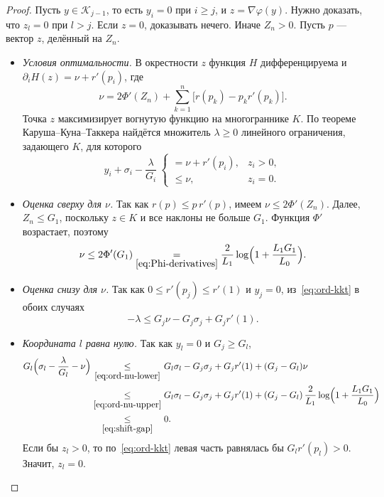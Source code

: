 \documentclass[11pt,a4paper]{article}
\newcommand{\by}[2]{\mathrel{\underset{#2}{#1}}}
\newcommand{\bypad}[3]{\mathrel{\underset{\mathmakebox[\widthof{$\scriptstyle#3$}]{#2}}{#1}}}
\begin{document}
\begin{proof}
Пусть $y\in\mathcal K_{j-1}$, то есть $y_i=0$ при $i\ge j$, и $z=\nabla\varphi(y)$. Нужно доказать, что $z_l=0$ при $l>j$. Если $z=0$, доказывать нечего. Иначе $Z_n>0$. Пусть $p$ --- вектор $z$, делённый на $Z_n$.
\begin{itemize}
\item \emph{Условия оптимальности.} В окрестности $z$ функция $H$ дифференцируема и $\partial_iH(z)=\nu+r'(p_i)$, где
\[
 \nu=2\Phi'(Z_n)+\sum_{k=1}^n\bigl[r(p_k)-p_kr'(p_k)\bigr].
\]
Точка $z$ максимизирует вогнутую функцию на многограннике $K$. По теореме Каруша--Куна--Таккера найдётся множитель $\lambda\ge0$ линейного ограничения, задающего $K$, для которого
\begin{equation}\label{eq:ord-kkt}
 y_i+\sigma_i-\frac\lambda{G_i}\ \begin{cases}=\nu+r'(p_i), & z_i>0,\\ \le\nu, & z_i=0.\end{cases}
\end{equation}
\item \emph{Оценка сверху для $\nu$.} Так как $r(p)\le p\,r'(p)$, имеем $\nu\le2\Phi'(Z_n)$. Далее, $Z_n\le G_1$, поскольку $z\in K$ и все наклоны не больше $G_1$. Функция $\Phi'$ возрастает, поэтому
\begin{equation}\label{eq:ord-nu-upper}
 \nu\le2\Phi'(G_1)\by{=}{\eqref{eq:Phi-derivatives}}\frac2{L_1}\log\Bigl(1+\frac{L_1G_1}{L_0}\Bigr).
\end{equation}
\item \emph{Оценка снизу для $\nu$.} Так как $0\le r'(p_j)\le r'(1)$ и $y_j=0$, из~\eqref{eq:ord-kkt} в обоих случаях
\begin{equation}\label{eq:ord-nu-lower}
 -\lambda\le G_j\nu-G_j\sigma_j+G_jr'(1) .
\end{equation}
\item \emph{Координата $l$ равна нулю.} Так как $y_l=0$ и $G_j\ge G_l$,
\begin{align*}
 G_l\Bigl(\sigma_l-\frac\lambda{G_l}-\nu\Bigr)
 &\bypad{\le}{\eqref{eq:ord-nu-lower}}{\eqref{eq:ord-nu-upper}}G_l\sigma_l-G_j\sigma_j+G_jr'(1)+(G_j-G_l)\nu\\
 &\by{\le}{\eqref{eq:ord-nu-upper}}G_l\sigma_l-G_j\sigma_j+G_jr'(1)+(G_j-G_l)\,\frac2{L_1}\log\Bigl(1+\frac{L_1G_1}{L_0}\Bigr)\\
 &\bypad{\le}{\eqref{eq:shift-gap}}{\eqref{eq:ord-nu-upper}}0 .
\end{align*}
Если бы $z_l>0$, то по~\eqref{eq:ord-kkt} левая часть равнялась бы $G_lr'(p_l)>0$. Значит, $z_l=0$.\qedhere
\end{itemize}
\end{proof}
\end{document}
